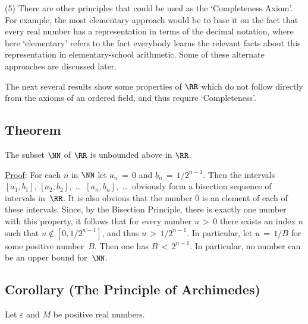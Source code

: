 \V

        (5) There are other principles that could be used as the `Completeness Axiom'.
    For example, the most elementary approach would be to base it on the fact that every real number has a representation in terms of the decimal notation,
    where here `elementary' refers to the fact everybody learns the relevant facts about this representation in elementary-school arithmetic.
    Some of these alternate approaches are discussed later.

\VV

        The next several results show some properties of ${\RR}$ which do not follow directly
    from the axioms of an ordered field, and thus require `Completeness'.

\V

            \subsection{\small{\bf Theorem}}
            \label{ThmB30.30}

        The subset ${\NN}$ of ${\RR}$ is unbounded above in ${\RR}$.

\V

        \underline{Proof}: For each $n$ in ${\NN}$ let $a_{n} \,=\, 0$ and $b_{n} \,=\, 1/2^{n-1}$.
    Then the intervals $[a_{1}, b_{1}]$, $[a_{2},b_{2}]$, \,{\ldots}\, $[a_{n},b_{n}]$, \,{\ldots}\,
    obviously form a bisection sequence of intervals in~${\RR}$. It is also obvious that the number $0$ is an element of each of these intervals.
    Since, by the Bisection Principle, there is exactly one number with this property,
    it follows that for every number $u\,>\,0$ there exists an index $n$ such that $u \not \in [0,1/2^{n-1}]$, and thus $u\,>\,1/2^{n-1}$.
    In particular, let $u \,=\, 1/B$ for some positive number~$B$. Then one has $B\,<\,2^{n-1}$. In particular, no number can be an upper bound for~${\NN}$.

\V


            \subsection{\small{\bf Corollary} (The Principle of Archimedes)}
            \label{CorB30.40}

\V

        Let ${\varepsilon}$ and $M$ be positive real numbers.

